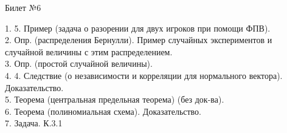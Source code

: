 \documentclass[preview]{standalone}
\begin{document}
 
\begin{center} {\Large Билет №6} \end{center} 

1. 5. Пример (задача о разорении для двух игроков при помощи ФПВ). \\

2.  Опр. (распределения Бернулли).  Пример случайных экспериментов и случайной величины с этим распределением.\\

3.  Опр. (простой случайной величины).\\

4. 4. Следствие (о независимости и корреляции для нормального вектора). Доказательство. \\

5.  Теорема (центральная предельная теорема) (без док-ва).\\

6.  Теорема (полиномиальная схема). Доказательство.\\

7. Задача. К.3.1\\
\end{document}
